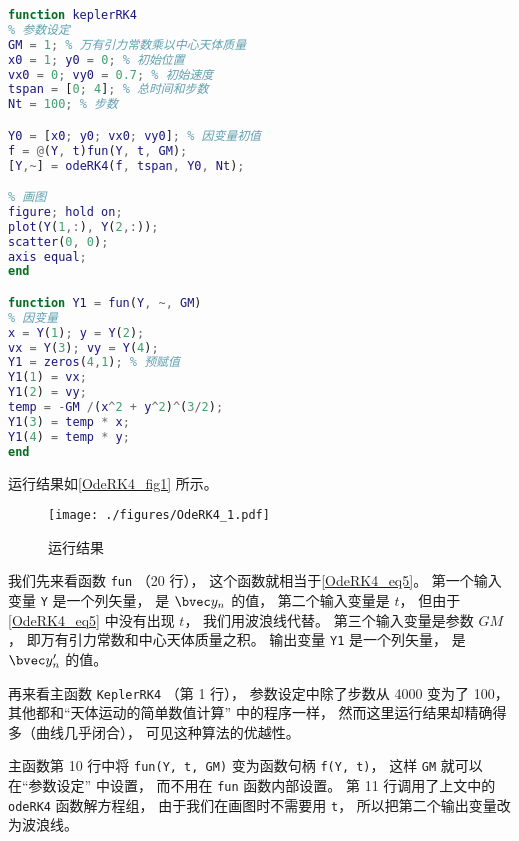 \begin{lstlisting}[language=matlab, caption=keplerRK4.m]
function keplerRK4
% 参数设定
GM = 1; % 万有引力常数乘以中心天体质量
x0 = 1; y0 = 0; % 初始位置
vx0 = 0; vy0 = 0.7; % 初始速度
tspan = [0; 4]; % 总时间和步数
Nt = 100; % 步数

Y0 = [x0; y0; vx0; vy0]; % 因变量初值
f = @(Y, t)fun(Y, t, GM);
[Y,~] = odeRK4(f, tspan, Y0, Nt);

% 画图
figure; hold on;
plot(Y(1,:), Y(2,:));
scatter(0, 0);
axis equal;
end

function Y1 = fun(Y, ~, GM)
% 因变量
x = Y(1); y = Y(2);
vx = Y(3); vy = Y(4);
Y1 = zeros(4,1); % 预赋值
Y1(1) = vx;
Y1(2) = vy;
temp = -GM /(x^2 + y^2)^(3/2);
Y1(3) = temp * x;
Y1(4) = temp * y;
end
\end{lstlisting}

运行结果如\autoref{OdeRK4_fig1} 所示。

\begin{figure}[ht]
\centering
\texttt{[image: ./figures/OdeRK4\_1.pdf]}
\caption{运行结果} \label{OdeRK4_fig1}
\end{figure}

我们先来看函数 \verb|fun| （20 行）， 这个函数就相当于\autoref{OdeRK4_eq5}。 第一个输入变量 \verb|Y| 是一个列矢量， 是 $\bvec y_n$ 的值， 第二个输入变量是 $t$， 但由于\autoref{OdeRK4_eq5} 中没有出现 $t$， 我们用波浪线代替。 第三个输入变量是参数 $GM$， 即万有引力常数和中心天体质量之积。 输出变量 \verb|Y1| 是一个列矢量， 是 $\bvec y'_n$ 的值。

再来看主函数 \verb|KeplerRK4| （第 1 行）， 参数设定中除了步数从 4000 变为了 100， 其他都和“天体运动的简单数值计算” 中的程序一样， 然而这里运行结果却精确得多（曲线几乎闭合）， 可见这种算法的优越性。

主函数第 10 行中将 \verb|fun(Y, t, GM)| 变为函数句柄 \verb|f(Y, t)|， 这样 \verb|GM| 就可以在“参数设定” 中设置， 而不用在 \verb|fun| 函数内部设置。 第 11 行调用了上文中的 \verb|odeRK4| 函数解方程组， 由于我们在画图时不需要用 \verb|t|， 所以把第二个输出变量改为波浪线。
